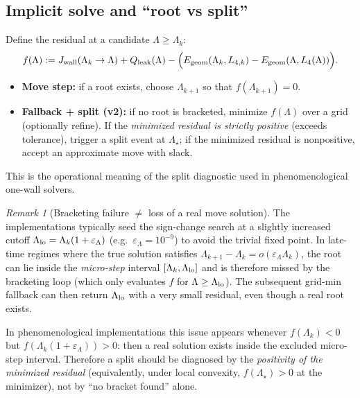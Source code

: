 \documentclass[11pt]{article}
\theoremstyle{definition}
\theoremstyle{plain}
\theoremstyle{remark}
\newtheorem{remark}[definition]{Remark}
\begin{document}
\subsection{Implicit solve and ``root vs split''}
\label{subsec:root-vs-split}

Define the residual at a candidate $\Lambda\ge \Lambda_k$:
\begin{equation}
f(\Lambda)
:=
J_{\rm wall}(\Lambda_k\to\Lambda)+Q_{\rm leak}(\Lambda)
-\Big(E_{\rm geom}(\Lambda_k,L_{4,k})-E_{\rm geom}(\Lambda,L_4(\Lambda))\Big).
\label{eq:residual}
\end{equation}
\begin{itemize}[leftmargin=1.6em]
\item \textbf{Move step:} if a root exists, choose $\Lambda_{k+1}$ so that $f(\Lambda_{k+1})=0$.
\item \textbf{Fallback + split (v2):} if no root is bracketed, minimize $f(\Lambda)$ over a grid (optionally refine).
If the \emph{minimized residual is strictly positive} (exceeds tolerance), trigger a split event at $\Lambda_\star$; if the
minimized residual is nonpositive, accept an approximate move with slack.
\end{itemize}
This is the operational meaning of the split diagnostic used in phenomenological one-wall solvers.

\begin{remark}[Bracketing failure $\neq$ loss of a real move solution]
\label{rem:bracketing-failure}
The implementations typically seed the sign-change search at a slightly increased cutoff
$\Lambda_{\rm lo}=\Lambda_k(1+\varepsilon_\Lambda)$ (e.g.\ $\varepsilon_\Lambda=10^{-9}$) to avoid the trivial fixed point.
In late-time regimes where the true solution satisfies $\Lambda_{k+1}-\Lambda_k=o(\varepsilon_\Lambda\Lambda_k)$, the
root can lie inside the \emph{micro-step} interval $[\Lambda_k,\Lambda_{\rm lo}]$ and is therefore missed by the bracketing
loop (which only evaluates $f$ for $\Lambda\ge\Lambda_{\rm lo}$).
The subsequent grid-min fallback can then return $\Lambda_{\rm lo}$ with a very small residual, even though a real root
exists.

In phenomenological implementations this issue appears whenever
$f(\Lambda_k)<0$ but $f(\Lambda_k(1+\varepsilon_\Lambda))>0$: then a real solution exists inside the excluded micro-step
interval.
Therefore a split should be diagnosed by the \emph{positivity of the minimized residual} (equivalently, under local
convexity, $f(\Lambda_\star)>0$ at the minimizer), not by ``no bracket found'' alone.
\end{remark}
\end{document}
